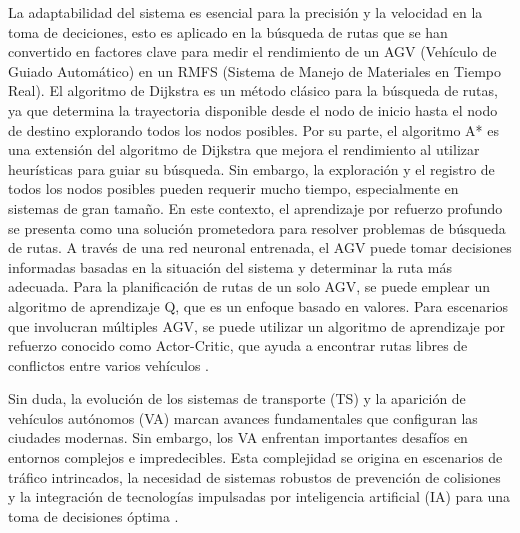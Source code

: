 \documentclass[conference]{IEEEtran}
\begin{document}
La adaptabilidad del sistema es esencial para la precisión y la velocidad en la toma de deciciones, esto es aplicado en la búsqueda de rutas que se han convertido en factores clave para medir el rendimiento de un AGV (Vehículo de Guiado Automático) en un RMFS (Sistema de Manejo de Materiales en Tiempo Real). El algoritmo de Dijkstra es un método clásico para la búsqueda de rutas, ya que determina la trayectoria disponible desde el nodo de inicio hasta el nodo de destino explorando todos los nodos posibles. Por su parte, el algoritmo A* es una extensión del algoritmo de Dijkstra que mejora el rendimiento al utilizar heurísticas para guiar su búsqueda. Sin embargo, la exploración y el registro de todos los nodos posibles pueden requerir mucho tiempo, especialmente en sistemas de gran tamaño. En este contexto, el aprendizaje por refuerzo profundo se presenta como una solución prometedora para resolver problemas de búsqueda de rutas. A través de una red neuronal entrenada, el AGV puede tomar decisiones informadas basadas en la situación del sistema y determinar la ruta más adecuada. Para la planificación de rutas de un solo AGV, se puede emplear un algoritmo de aprendizaje Q, que es un enfoque basado en valores. Para escenarios que involucran múltiples AGV, se puede utilizar un algoritmo de aprendizaje por refuerzo conocido como Actor-Critic, que ayuda a encontrar rutas libres de conflictos entre varios vehículos \cite{A_dqn}.
 
Sin duda, la evolución de los sistemas de transporte (TS) y la aparición de vehículos autónomos (VA) marcan avances fundamentales que configuran las ciudades modernas. Sin embargo, los VA enfrentan importantes desafíos en entornos complejos e impredecibles. 
Esta complejidad se origina en escenarios de tráfico intrincados, la necesidad de sistemas robustos de prevención de colisiones y la integración de tecnologías impulsadas por inteligencia artificial (IA) para una toma de decisiones óptima \cite{Smart_Agent,Reinfor_Control,traffic_lights}. %
\end{document}

